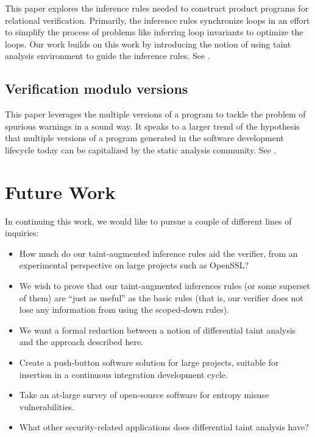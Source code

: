 \documentclass[letterpaper,twocolumn,10pt]{article}
\begin{document}
This paper explores the inference rules needed to construct product programs for relational verification. Primarily, the inference rules synchronize loops in an effort to simplify the process of problems like inferring loop invariants to optimize the loops. Our work builds on this work by introducing the notion of using taint analysis environment to guide the inference rules. See \cite{barthe2011relational}.

\subsection{Verification modulo versions}

This paper leverages the multiple versions of a program to tackle the problem of spurious warnings in a sound way. It speaks to a larger trend of the hypothesis that multiple versions of a program generated in the software development lifecycle today can be capitalized by the static analysis community. See \cite{logozzo2014verification}.


\section{Future Work}

In continuing this work, we would like to pursue a couple of different lines of inquiries:

\begin{itemize}
    \item How much do our taint-augmented inference rules aid the verifier, from an experimental perspective on large projects such as OpenSSL?
    \item We wish to prove that our taint-augmented inferences rules (or some superset of them) are ``just as useful'' as the basic rules (that is,
    our verifier does not lose any information from using the scoped-down rules).
    \item We want a formal reduction between a notion of differential taint analysis and the approach described here.
    \item Create a push-button software solution for large projects, suitable for insertion in a continuous integration development cycle.
    \item Take an at-large survey of open-source software for entropy misuse vulnerabilities.
    \item What other security-related applications does differential taint analysis have?
\end{itemize}
\end{document}
